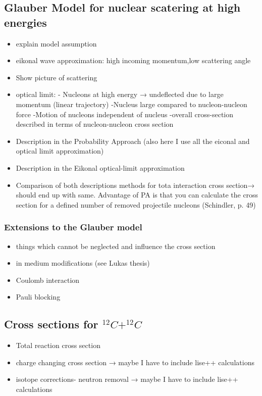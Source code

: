 \subsection{Glauber Model for nuclear scatering at high energies}
\begin{itemize}
\item explain model assumption
\item eikonal wave approximation: high incoming momentum,low scattering angle
\item Show picture of scattering
\item optical limit: - Nucleons at high energy → undeflected due to large momentum (linear trajectory)
		   -Nucleus large compared to nucleon-nucleon  force
		   -Motion of nucleons independent of nucleus
		   -overall cross-section described in terms of nucleon-nucleon cross section
\item Description in the Probability Approach (also here I use all the eiconal and optical limit approximation)
\item Description in the Eikonal optical-limit approximation
\item Comparison of both descriptions methods  for tota interaction cross section→ should end up with same. Advantage of PA is that you can calculate the cross section for a defined number of removed projectile nucleons (Schindler, p. 49)
\end{itemize}
\subsubsection{Extensions to the Glauber model}
\begin{itemize}
\item things which cannot be neglected and influence the cross section
\item in medium modifications (see Lukas thesis)
\item Coulomb interaction
\item Pauli blocking
\end{itemize}
\subsection{Cross sections for $^{12}C + ^{12}C$}
\begin{itemize}
\item Total reaction cross section
\item charge changing cross section → maybe I have to include lise++ calculations
\item isotope corrections- neutron removal → maybe I have to include lise++ calculations
\end{itemize}

